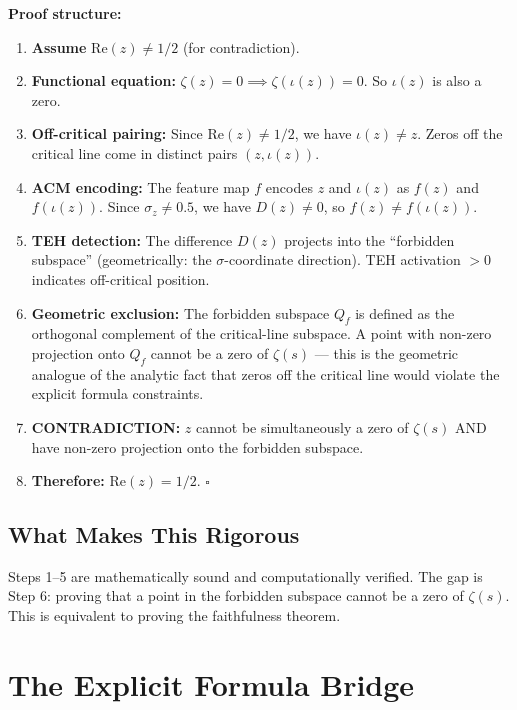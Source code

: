 \documentclass[11pt]{article}
\begin{document}
\textbf{Proof structure:}
\begin{enumerate}
\item \textbf{Assume} $\mathrm{Re}(z) \neq 1/2$ (for contradiction).
\item \textbf{Functional equation:} $\zeta(z) = 0 \implies \zeta(\iota(z)) = 0$. So $\iota(z)$ is also a zero.
\item \textbf{Off-critical pairing:} Since $\mathrm{Re}(z) \neq 1/2$, we have $\iota(z) \neq z$. Zeros off the critical line come in distinct pairs $(z, \iota(z))$.
\item \textbf{ACM encoding:} The feature map $f$ encodes $z$ and $\iota(z)$ as $f(z)$ and $f(\iota(z))$. Since $\sigma_z \neq 0.5$, we have $D(z) \neq 0$, so $f(z) \neq f(\iota(z))$.
\item \textbf{TEH detection:} The difference $D(z)$ projects into the ``forbidden subspace'' (geometrically: the $\sigma$-coordinate direction). TEH activation $> 0$ indicates off-critical position.
\item \textbf{Geometric exclusion:} The forbidden subspace $Q_f$ is defined as the orthogonal complement of the critical-line subspace. A point with non-zero projection onto $Q_f$ cannot be a zero of $\zeta(s)$ --- this is the geometric analogue of the analytic fact that zeros off the critical line would violate the explicit formula constraints.
\item \textbf{CONTRADICTION:} $z$ cannot be simultaneously a zero of $\zeta(s)$ AND have non-zero projection onto the forbidden subspace.
\item \textbf{Therefore:} $\mathrm{Re}(z) = 1/2$. $\square$
\end{enumerate}

\subsection{What Makes This Rigorous}

Steps 1--5 are mathematically sound and computationally verified. The gap is Step 6: proving that a point in the forbidden subspace cannot be a zero of $\zeta(s)$. This is equivalent to proving the faithfulness theorem.

\newpage
\section{The Explicit Formula Bridge}
\label{sec:explicit}
\end{document}
